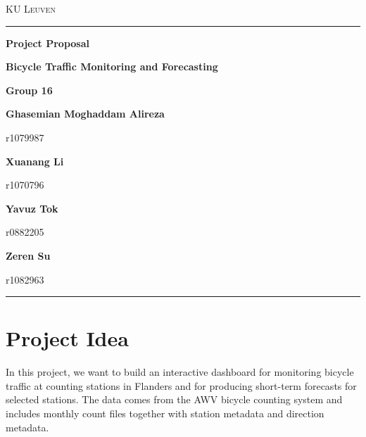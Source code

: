 \documentclass[11pt]{article}
\author{}
\date{}
\newcommand{\proposaltitle}{Bicycle Traffic Monitoring and Forecasting}
\begin{document}
\begin{center}
    {\small\scshape KU Leuven \par}
    \vspace{0.8em}
    {\color{MidnightBlue}\rule{0.85\textwidth}{1.1pt}\par}
    \vspace{1em}
    {\Huge\bfseries Project Proposal\par}
    \vspace{0.55em}
    {\LARGE\bfseries \proposaltitle\par}
    \vspace{1em}
    {\large\color{MidnightBlue}\textbf{Group 16}\par}
    \vspace{1.1em}
    {\normalsize\textbf{Ghasemian Moghaddam Alireza}\par}
    {\small\color{gray}r1079987\par}
    \vspace{0.6em}

    {\normalsize\textbf{Xuanang Li}\par}
    {\small\color{gray}r1070796\par}
    \vspace{0.6em}

    {\normalsize\textbf{Yavuz Tok}\par}
    {\small\color{gray}r0882205\par}
    \vspace{0.6em}

    {\normalsize\textbf{Zeren Su}\par}
    {\small\color{gray}r1082963\par}
    \vspace{0.9em}
    {\color{MidnightBlue}\rule{0.85\textwidth}{0.9pt}\par}
\end{center}

\vspace{1.1em}

\section{Project Idea}

In this project, we want to build an interactive dashboard for monitoring bicycle traffic at counting stations in Flanders and for producing short-term forecasts for selected stations. The data comes from the AWV bicycle counting system and includes monthly count files together with station metadata and direction metadata.
\end{document}
